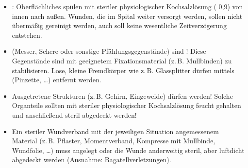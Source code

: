 \documentclass[
ngerman,
paper=a4,
asymmetric,
fontsize=9pt,
draft=false,
openany,
numbers=noenddot,
bibtotocnumbered,
footnotes=multiple,
toc=flat,
]{scrbook}
\begin{document}
{\begin{itemize}
  \item {}: Oberflächliches spülen mit
  steriler physiologischer
  Kochsalzlösung (
  0,9\PC*) von innen
  nach außen. Wunden, die im Spital weiter versorgt werden, sollen
  nicht übermäßig gereinigt werden, auch soll keine
  wesentliche Zeitverzögerung entstehen.  
  \item {} (Messer, Schere oder sonstige
  Pfählungsgegenstände) sind !
  Diese Gegenstände sind mit geeignetem Fixationsmaterial
  (z.\,B. Mullbinden) zu stabilisieren. Lose, kleine
  Fremdkörper wie z.\,B. Glassplitter dürfen mittels  (Pinzette, {\ldots}) entfernt
  werden.
  \item Ausgetretene Strukturen (z.\,B. Gehirn, Eingeweide)
  dürfen  werden! Solche Organteile
  sollten mit steriler physiologischer Kochsalzlösung
feucht gehalten und anschließend steril abgedeckt werden! 
  \item Ein steriler
  Wundverband mit der jeweiligen Situation angemessenem
  Material (z.\,B. Pflaster, Momentverband, Kompresse mit
  Mullbinde, Wundfolie, \ldots) muss angelegt oder die
  Wunde anderweitig steril, aber  luftdicht
  abgedeckt werden (Ausnahme: Bagatellverletzungen).
\end{itemize}
}
{}
\end{document}
